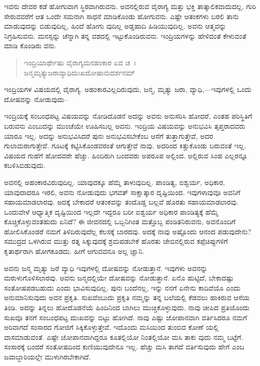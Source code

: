 ಇವನು ದೇವರ ಕಡೆ ಹೋಗುವಾಗ ಸ್ಥಿರವಾಗಿರುವನು. ಅವನಲ್ಲಿರುವ ವೈರಾಗ್ಯ ಮತ್ತು ಭಕ್ತಿ ತಾತ್ಕಾಲಿಕವಾದುದಲ್ಲ. ಗುರಿ ಸೇರುವವರೆಗೆ ಆತ ಒಂದೇ ಸಮನಾಗಿ ಸಾಧನೆ ಮಾಡಿಕೊಂಡು ಹೋಗುವನು. ಎಷ್ಟೇ ಆತಂಕಗಳು ಬರಲಿ ತಾನು ಮಾಡುವುದನ್ನು ಬಿಡುವುದಿಲ್ಲ, ಹಿಂದೆ ಹೋಗು ವುದಿಲ್ಲ ಅಡ್ಡಹಾದಿ ಹಿಡಿಯುವುದಿಲ್ಲ. ಅವನು ಆತ್ಮವನ್ನು ನಿಗ್ರಹಿಸುವನು. ಮನಸ್ಸನ್ನು ಚೆನ್ನಾಗಿ ತನ್ನ ವಶದಲ್ಲಿ ಇಟ್ಟುಕೊಂಡಿರುವನು. ಇಂದ್ರಿಯಗಳನ್ನು ಹೇಳಿದಂತೆ ಕೇಳುವಂತೆ ಮಾಡಿ ಕೊಂಡಿರು ವನು.

\begin{verse}
ಇಂದ್ರಿಯಾರ್ಥೇಷು ವೈರಾಗ್ಯಮನಹಂಕಾರ ಏವ ಚ~।\\ಜನ್ಮಮೃತ್ಯುಜರಾವ್ಯಾಧಿದುಃಖದೋಷಾನುದರ್ಶನಮ್ 
\end{verse}

{\small ಇಂದ್ರಿಯಗಳ ವಿಷಯದಲ್ಲಿ ವೈರಾಗ್ಯ. ಅಹಂಕಾರವಿಲ್ಲದಿರುವುದು, ಜನ್ಮ, ಮೃತ್ಯು ಜರಾ, ವ್ಯಾಧಿ,—ಇವುಗಳಲ್ಲಿ ಒಂದು ದೋಷವನ್ನು ನೋಡುವುದು–}

ಇಂದ್ರಿಯಕ್ಕೆ ಸಂಬಂಧಪಟ್ಟ ವಿಷಯವನ್ನು ನೋಡಿದೊಡನೆ ಅದನ್ನು ಅವನು ಅನುಸರಿಸಿ ಹೋದರೆ, ಎಂತಹ ಪರಿಸ್ಥಿತಿಗೆ ಬರುವನು ಎಂಬುದನ್ನು ಮುಂಚೆಯೇ ಊಹಿಸಬಲ್ಲ ಅವನು. ಇಂದ್ರಿಯ ವಿಷಯವನ್ನು ಅನುಭವಿಸಿ ತೃಪ್ತರಾದವರು ಯಾರೂ ಇಲ್ಲ. ಅದನ್ನು ಅನುಭವಿಸಿದರೆ ಪುನಃ ಅನುಭವಿಸಬೇಕೆಂಬ ಆಸೆಗೆ ತುತ್ತಾಗುತ್ತೇವೆ, ಅದರ ಗುಲಾಮರಾಗುತ್ತೇವೆ. ಗೂಟಕ್ಕೆ ಕಟ್ಟಿಸಿಕೊಂಡವರಂತೆ ಆಗುತ್ತೇವೆ ನಾವು. ಅದರಿಂದ ಕಿತ್ತುಕೊಂಡು ಬರುವಂತೆ ಇಲ್ಲ. ವಿಷಯದ ಗುಹೆಗೆ ಹೋದವರೇ ಹೆಚ್ಚು. ಹಿಂದಿರುಗಿ ಬಂದವರು ಅಪರೂಪ ಅಲ್ಲಿಂದ. ಅಲ್ಲಿರುವ ಸಿಂಹ ಎಲ್ಲರನ್ನೂ ಕಬಳಿಸಿಬಿಡುವುದು.

ಅವನಲ್ಲಿ ಅಹಂಕಾರವಿರುವುದಿಲ್ಲ. ಯಾವುದಕ್ಕೂ ಹೆಮ್ಮೆ ತಾಳುವುದಿಲ್ಲ. ಪಾಂಡಿತ್ಯ, ಐಶ್ವರ್ಯ, ಅಧಿಕಾರ, ಯಾವುದಾದರೂ ಇರಲಿ, ಅವನು ನೋಡುವುದು ಭಗವತ್ ಸಾಕ್ಷಾತ್ಕಾರ ದೃಷ್ಟಿಯಿಂದ. ಇವುಗಳಾವುವೂ ಅವನಿಗೆ ಸಹಾಯಮಾಡಲಾರವು. ಅದಕ್ಕೆ ಬೇಕಾದರೆ ಆತಂಕವನ್ನು ತಂದೊಡ್ಡ ಬಲ್ಲವೆ ಹೊರತು ಸಹಾಯಮಾಡಲಾರವು. ಒಂದುವೇಳೆ ಆಧ್ಯಾತ್ಮಿಕ ದೃಷ್ಟಿಯಿಂದ ಇಲ್ಲದೇ ಇದ್ದರೂ ಬರೀ ಐಶ್ವರ್ಯ ಅಧಿಕಾರ ಪಾಂಡಿತ್ಯಕ್ಕೆ ಹೆಮ್ಮೆ ಕೊಚ್ಚಿಕೊಳ್ಳುವಂತಹುದು ಏನಿದೆ? ಈ ಜೀವನದಲ್ಲಿ ಒಬ್ಬನಿಗಿಂತ ಮತ್ತೊಬ್ಬ ಪಂಡಿತನಿರುವನು, ಅವನೊಂದಿಗೆ ಹೋಲಿಸಿಕೊಂಡರೆ ನಮಗೆ ತಿಳಿದಿರುವುದೆಲ್ಲ ಕೆಲಸಕ್ಕೆ ಬಾರದವು. ಅದಕ್ಕೆ ನಾವು ಅಷ್ಟೊಂದು ಆನಂದ ಪಡುವುದೇನು? ಸಮುದ್ರದ ಒಳಗಿರುವ ಮುತ್ತು ರತ್ನ ಸಿಕ್ಕುವುದಕ್ಕೆ ಶ್ರಮಪಡಬೇಕೆ ಹೊರತು ಜೇಬಿನಲ್ಲಿರುವ ಕಪ್ಪೆಚಿಪ್ಪುಗಳಿಗೆ ಕೃತಾರ್ಥರಾಗಿ ಹೋಗಕೂಡದು. ಹೀಗೆ ಆಗುವವನೂ ಅಲ್ಲ ಜ್ಞಾನಿ.

ಅವನು ಜನ್ಮ ಮೃತ್ಯು ಜರೆ ವ್ಯಾಧಿ ಇವುಗಳಲ್ಲಿ ದೋಷವನ್ನು ನೋಡುತ್ತಾನೆ. ಇವುಗಳು ಅವನನ್ನು ಮರುಳುಗೊಳಿಸಲಾರವು. ಅವನು ಜನ್ಮದಲ್ಲಿಯೇ ದೋಷವನ್ನು ನೋಡುತ್ತಾನೆ. ಏನೊ ಹುಟ್ಟಿದೆ, ಬೇಕಾದಷ್ಟು ಸಂತೋಷಪಡಬಹುದು ಎಂದು ಭಾವಿಸುವುದಿಲ್ಲ. ಪುನಃ ಬಂದೆನಲ್ಲ, ಇನ್ನು ನನಗೆ ಏನೇನು ಕಾದಿವೆಯೊ ಎಂದು ಅನುಮಾನಿಸುವುದು ಅವನ ಪ್ರಕೃತಿ. ಸುಖವೆಂಬುದು ಪ್ರಕೃತಿ ನಮ್ಮನ್ನು ತನ್ನ ಬಲೆಯಲ್ಲಿ ಕೆಡವಲು ಹಾಕಿರುವ ಆಸೆಯ ತಿಂಡಿ. ಅದನ್ನು ತಿನ್ನಲು ಹೋದೊಡನೆಯೆ ಹಿಂದಿನಿಂದ ಬಾಗಿಲು ಮುಚ್ಚಿಕೊಳ್ಳುವುದು. ನಾವು ಚೀಪಿದ ಪ್ರತಿಯೊಂದು ಸುಖವೂ ತನಗೆ ಸಂಬಂಧಪಟ್ಟ ದುಃಖವನ್ನು ಬಿಟ್ಟು ಹೋಗಿದೆ. ನಾವು ಎಷ್ಟು ಜೋಪಾನವಾಗಿ ವರ್ತಿಸಿದರೂ ನಮಗೆ ಅರಿವಾಗದೆ ಸಂಸಾರದ ಗೋಜಿಗೆ ಸಿಕ್ಕಿಕೊಳ್ಳುತ್ತೇವೆ. ಇದೊಂದು ಮಸಿಯಿಂದ ತುಂಬಿದ ಕೋಣೆ ಯಲ್ಲಿ ವಾಸಮಾಡುವಂತೆ. ಎಷ್ಟೇ ಜೋಪಾನವಾಗಿದ್ದರೂ ಕೂತಲ್ಲಿಯೋ ನಿಂತಲ್ಲಿಯೋ ಮಸಿ ತಾಕು ವುದು ನಮ್ಮ ಬಟ್ಟೆಗೆ. ಸಂಸಾರಕ್ಕೆ ಬಂದರೆ ಸಂತೋಷದಿಂದ ಕುಣಿಯುವುದೇನೂ ಇಲ್ಲ. ಹೆಚ್ಚು ಮಸಿ ತಾಗದೆ ವರ್ತಿಸುವುದು ಹೇಗೆ ಎಂಬ ಜವಾಬ್ದಾರಿಯಲ್ಲೇ ಮುಳುಗಿರಬೇಕಾಗಿದೆ.

